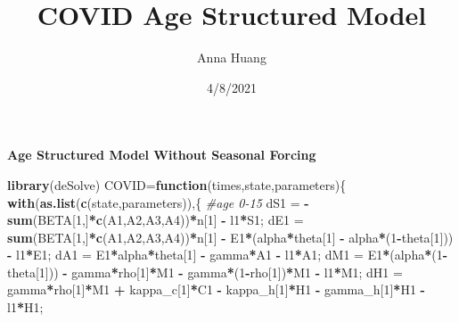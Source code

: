 \documentclass[
]{article}
\title{COVID Age Structured Model}
\author{Anna Huang}
\date{4/8/2021}
\newenvironment{Shaded}{\begin{snugshade}}{\end{snugshade}}
\newcommand{\CommentTok}[1]{\textcolor[rgb]{0.56,0.35,0.01}{\textit{#1}}}
\newcommand{\ControlFlowTok}[1]{\textcolor[rgb]{0.13,0.29,0.53}{\textbf{#1}}}
\newcommand{\DecValTok}[1]{\textcolor[rgb]{0.00,0.00,0.81}{#1}}
\newcommand{\KeywordTok}[1]{\textcolor[rgb]{0.13,0.29,0.53}{\textbf{#1}}}
\newcommand{\NormalTok}[1]{#1}
\newcommand{\OperatorTok}[1]{\textcolor[rgb]{0.81,0.36,0.00}{\textbf{#1}}}
\newcommand{\StringTok}[1]{\textcolor[rgb]{0.31,0.60,0.02}{#1}}
\begin{document}
\maketitle

\textbf{Age Structured Model Without Seasonal Forcing}

\begin{Shaded}
\begin{Highlighting}[]
\KeywordTok{library}\NormalTok{(deSolve)}
\NormalTok{COVID=}\ControlFlowTok{function}\NormalTok{(times,state,parameters)\{}
  \KeywordTok{with}\NormalTok{(}\KeywordTok{as.list}\NormalTok{(}\KeywordTok{c}\NormalTok{(state,parameters)),\{}
  \CommentTok{#age 0-15}
\NormalTok{    dS1 =}\StringTok{ }\OperatorTok{-}\StringTok{ }\KeywordTok{sum}\NormalTok{(BETA[}\DecValTok{1}\NormalTok{,]}\OperatorTok{*}\KeywordTok{c}\NormalTok{(A1,A2,A3,A4))}\OperatorTok{*}\NormalTok{n[}\DecValTok{1}\NormalTok{] }\OperatorTok{-}\StringTok{ }\NormalTok{l1}\OperatorTok{*}\NormalTok{S1;}
\NormalTok{    dE1 =}\StringTok{ }\KeywordTok{sum}\NormalTok{(BETA[}\DecValTok{1}\NormalTok{,]}\OperatorTok{*}\KeywordTok{c}\NormalTok{(A1,A2,A3,A4))}\OperatorTok{*}\NormalTok{n[}\DecValTok{1}\NormalTok{] }\OperatorTok{-}\StringTok{ }\NormalTok{E1}\OperatorTok{*}\NormalTok{(alpha}\OperatorTok{*}\NormalTok{theta[}\DecValTok{1}\NormalTok{] }\OperatorTok{-}\StringTok{ }\NormalTok{alpha}\OperatorTok{*}\NormalTok{(}\DecValTok{1}\OperatorTok{-}\NormalTok{theta[}\DecValTok{1}\NormalTok{])) }\OperatorTok{-}\StringTok{ }\NormalTok{l1}\OperatorTok{*}\NormalTok{E1;}
\NormalTok{    dA1 =}\StringTok{ }\NormalTok{E1}\OperatorTok{*}\NormalTok{alpha}\OperatorTok{*}\NormalTok{theta[}\DecValTok{1}\NormalTok{] }\OperatorTok{-}\StringTok{ }\NormalTok{gamma}\OperatorTok{*}\NormalTok{A1 }\OperatorTok{-}\StringTok{ }\NormalTok{l1}\OperatorTok{*}\NormalTok{A1;}
\NormalTok{    dM1 =}\StringTok{ }\NormalTok{E1}\OperatorTok{*}\NormalTok{(alpha}\OperatorTok{*}\NormalTok{(}\DecValTok{1}\OperatorTok{-}\NormalTok{theta[}\DecValTok{1}\NormalTok{])) }\OperatorTok{-}\StringTok{ }\NormalTok{gamma}\OperatorTok{*}\NormalTok{rho[}\DecValTok{1}\NormalTok{]}\OperatorTok{*}\NormalTok{M1 }\OperatorTok{-}\StringTok{ }\NormalTok{gamma}\OperatorTok{*}\NormalTok{(}\DecValTok{1}\OperatorTok{-}\NormalTok{rho[}\DecValTok{1}\NormalTok{])}\OperatorTok{*}\NormalTok{M1 }\OperatorTok{-}\StringTok{ }\NormalTok{l1}\OperatorTok{*}\NormalTok{M1;}
\NormalTok{    dH1 =}\StringTok{ }\NormalTok{gamma}\OperatorTok{*}\NormalTok{rho[}\DecValTok{1}\NormalTok{]}\OperatorTok{*}\NormalTok{M1 }\OperatorTok{+}\StringTok{ }\NormalTok{kappa_c[}\DecValTok{1}\NormalTok{]}\OperatorTok{*}\NormalTok{C1 }\OperatorTok{-}\StringTok{ }\NormalTok{kappa_h[}\DecValTok{1}\NormalTok{]}\OperatorTok{*}\NormalTok{H1 }\OperatorTok{-}\StringTok{ }\NormalTok{gamma_h[}\DecValTok{1}\NormalTok{]}\OperatorTok{*}\NormalTok{H1 }\OperatorTok{-}\StringTok{ }\NormalTok{l1}\OperatorTok{*}\NormalTok{H1;}

\end{Highlighting}
\end{Shaded}
\end{document}
